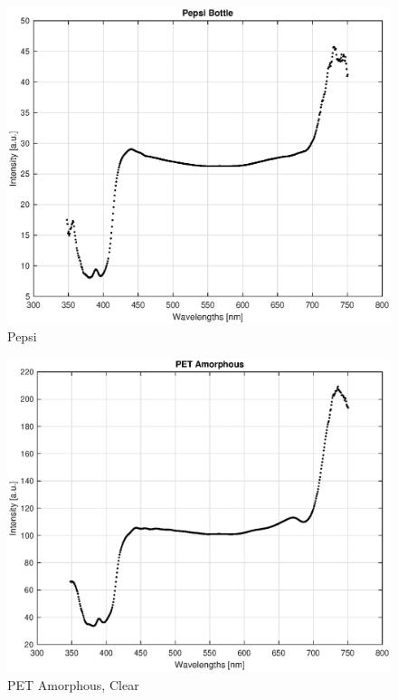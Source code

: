 \begin{appendices}
\begin{figure}
    \centering
    \includegraphics[width = 12cm]{Images/appendix/pepsi.eps}
    \caption{Pepsi}
    \label{fig:pepsi}
\end{figure}

\begin{figure}
    \centering
    \includegraphics[width = 12cm]{Images/appendix/pet-amorphous-pristine-clear.eps}
    \caption{PET Amorphous, Clear}
    \label{fig:pet}
\end{figure}


\end{appendices}
